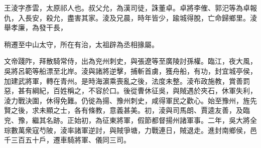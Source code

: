 \begin{pinyinscope}
 
 
 王淩字彥雲，太原祁人也。叔父允，為漢司徒，誅董卓。卓將李傕、郭汜等為卓報仇，入長安，殺允，盡害其家。淩及兄晨，時年皆少，踰城得脫，亡命歸鄉里。淩舉孝廉，為發干長，
 
 
 稍遷至中山太守，所在有治，太祖辟為丞相掾屬。
 
 
 
 
 文帝踐阼，拜散騎常侍，出為兖州刺史，與張遼等至廣陵討孫權。臨江，夜大風，吳將呂範等船漂至北岸。淩與諸將逆擊，捕斬首虜，獲舟船，有功，封宜城亭侯，加建武將軍，轉在青州。是時海濵乘喪亂之後，法度未整。淩布政施教，賞善罰惡，甚有綱紀，百姓稱之，不容於口。後從曹休征吳，與賊遇於夾石，休軍失利，淩力戰決圍，休得免難。仍徙為揚、豫州刺史，咸得軍民之歡心。始至豫州，旌先賢之後，求未顯之士，各有條教，意義甚美。初，淩與司馬朗、賈逵友善，及臨兖、豫，繼其名跡。正始初，為征東將軍，假節都督揚州諸軍事。二年，吳大將全琮數萬衆寇芍陂，淩率諸軍逆討，與賊爭塘，力戰連日，賊退走。進封南鄉侯，邑千三百五十戶，遷車騎將軍、儀同三司。
 

\end{pinyinscope}
